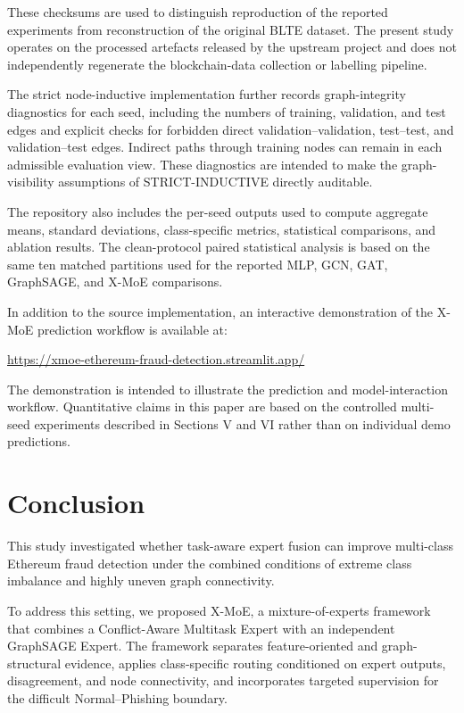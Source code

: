 \documentclass{ieeeaccess}
\begin{document}
These checksums are used to distinguish reproduction of the reported experiments from reconstruction of the original BLTE dataset. The present study operates on the processed artefacts released by the upstream project and does not independently regenerate the blockchain-data collection or labelling pipeline.

The strict node-inductive implementation further records graph-integrity diagnostics for each seed, including the numbers of training, validation, and test edges and explicit checks for forbidden direct validation--validation, test--test, and validation--test edges. Indirect paths through training nodes can remain in each admissible evaluation view. These diagnostics are intended to make the graph-visibility assumptions of STRICT-INDUCTIVE directly auditable.

The repository also includes the per-seed outputs used to compute aggregate means, standard deviations, class-specific metrics, statistical comparisons, and ablation results. The clean-protocol paired statistical analysis is based on the same ten matched partitions used for the reported MLP, GCN, GAT, GraphSAGE, and X-MoE comparisons.

In addition to the source implementation, an interactive demonstration of the X-MoE prediction workflow is available at:

\begin{center}
\url{https://xmoe-ethereum-fraud-detection.streamlit.app/}
\end{center}

The demonstration is intended to illustrate the prediction and model-interaction workflow. Quantitative claims in this paper are based on the controlled multi-seed experiments described in Sections V and VI rather than on individual demo predictions.


\section{Conclusion}

This study investigated whether task-aware expert fusion can improve multi-class Ethereum fraud detection under the combined conditions of extreme class imbalance and highly uneven graph connectivity.

To address this setting, we proposed X-MoE, a mixture-of-experts framework that combines a Conflict-Aware Multitask Expert with an independent GraphSAGE Expert. The framework separates feature-oriented and graph-structural evidence, applies class-specific routing conditioned on expert outputs, disagreement, and node connectivity, and incorporates targeted supervision for the difficult Normal--Phishing boundary.
\end{document}
